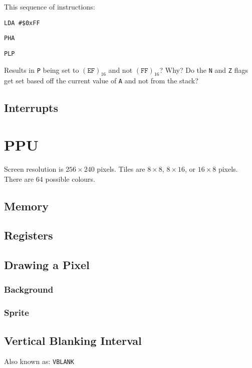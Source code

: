 \documentclass[10pt, draft]{book}
\begin{document}
  This sequence of instructions:

  \texttt{LDA \#\$0xFF}

  \texttt{PHA}

  \texttt{PLP}

  \noindent Results in \texttt{P} being set to $(\texttt{EF})_{16}$ and not
  $(\texttt{FF})_{16}$? Why? Do the \texttt{N} and \texttt{Z} flags get set
  based off the current value of \texttt{A} and not from the stack?

  \section{Interrupts}

  \chapter{PPU}

  Screen resolution is $256 \times 240$ pixels.
  Tiles are $8 \times 8$, $8 \times 16$, or $16 \times 8$ pixels.
  There are $64$ possible colours.

  \section{Memory}

  \section{Registers}

  \section{Drawing a Pixel}

  \subsection{Background}

  \subsection{Sprite}

  \section{Vertical Blanking Interval}

  Also known as: \texttt{VBLANK}
\end{document}
